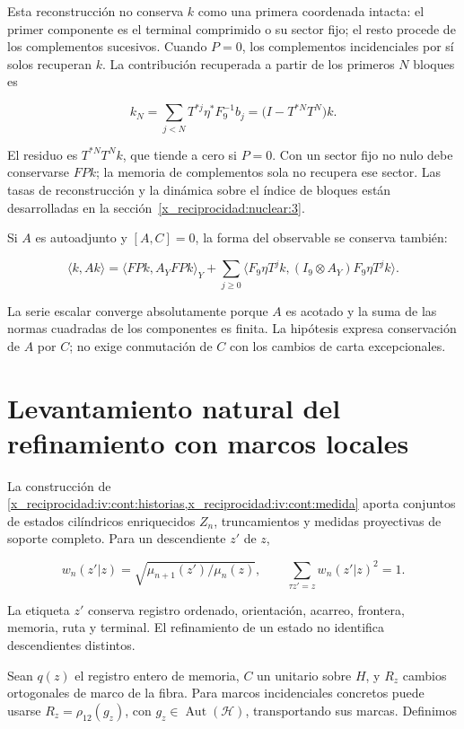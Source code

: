 Esta reconstrucción no conserva \(k\) como una primera coordenada intacta: el primer componente es el terminal comprimido o su sector fijo; el resto procede de los complementos sucesivos. Cuando \(P=0\), los complementos incidenciales por sí solos recuperan \(k\). La contribución recuperada a partir de los primeros \(N\) bloques es

\[
k_N=\sum_{j<N}T^{*j}\eta^*F_9^{-1}b_j
=\bigl(I-T^{*N}T^N\bigr)k.
\]

El residuo es \(T^{*N}T^Nk\), que tiende a cero si \(P=0\). Con un sector fijo no nulo debe conservarse \(FPk\); la memoria de complementos sola no recupera ese sector. Las tasas de reconstrucción y la dinámica sobre el índice de bloques están desarrolladas en la sección~\ref{x_reciprocidad:nuclear:3}.

Si \(A\) es autoadjunto y \([A,C]=0\), la forma del observable se conserva también:

\[
\langle k,Ak\rangle
=\langle FPk,A_YFPk\rangle_Y
+\sum_{j\ge0}\langle F_9\eta T^jk,(I_9\otimes A_Y)F_9\eta T^jk\rangle.
\]

La serie escalar converge absolutamente porque \(A\) es acotado y la suma de las normas cuadradas de los componentes es finita. La hipótesis expresa conservación de \(A\) por \(C\); no exige conmutación de \(C\) con los cambios de carta excepcionales.

\section{Levantamiento natural del refinamiento con marcos locales}\label{x_reciprocidad:nuc05:refinamiento}

La construcción de \cref{x_reciprocidad:iv:cont:historias,x_reciprocidad:iv:cont:medida} aporta conjuntos de estados cilíndricos enriquecidos \(Z_n\), truncamientos y medidas proyectivas de soporte completo. Para un descendiente \(z'\) de \(z\),

\[
w_n(z'|z)=\sqrt{\mu_{n+1}(z')/\mu_n(z)},\qquad
\sum_{\tau z'=z}w_n(z'|z)^2=1.
\]

La etiqueta \(z'\) conserva registro ordenado, orientación, acarreo, frontera, memoria, ruta y terminal. El refinamiento de un estado no identifica descendientes distintos.

Sean \(q(z)\) el registro entero de memoria, \(C\) un unitario sobre \(H\), y \(R_z\) cambios ortogonales de marco de la fibra. Para marcos incidenciales concretos puede usarse \(R_z=\rho_{12}(g_z)\), con \(g_z\in\operatorname{Aut}(\mathcal H)\), transportando sus marcas. Definimos


